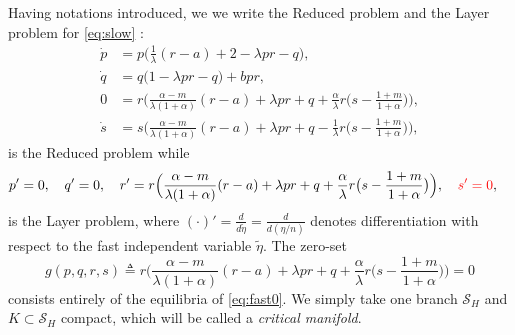 \documentclass[a4paper,11pt]{article}
\def\red{\color{red}}
\theoremstyle{remark}
\begin{document}
Having notations introduced, we we write the Reduced problem and the Layer problem for \eqref{eq:slow} :
\begin{equation}\label{eq:slow0} \tag{R}
 \begin{aligned}
 \dot{p} &=p\Big(\frac{1}{\lambda}({r}-a) + 2- \lambda p {r} -q\Big),\\%
 \dot{q} &=q\Big(1 -\lambda p {r} -q\Big) + b p {r},\\%
 0&=r\Big(\frac{\alpha-m}{\lambda(1+\alpha)}(r-a) + \lambda pr + q +\frac{\alpha}{\lambda}r\big(s- \frac{1+m}{1+\alpha}\big)\Big),\\
 \dot{s} &=s\Big(\frac{\alpha-m}{\lambda(1+\alpha)}({r}-a) + \lambda p{r} + q - \frac{1}{\lambda}{r}\big(s- \frac{1+m}{1+\alpha}\big)\Big),%
 \end{aligned}
\end{equation}
is the Reduced problem while
\begin{equation} \label{eq:fast0} 
 \begin{aligned}
 {p}' &=0, \quad {q}' =0, \quad {r}' =r\Big(\frac{\alpha-m}{\lambda(1+\alpha)}(r-a) + \lambda pr + q +\frac{\alpha}{\lambda}r\big(s- \frac{1+m}{1+\alpha}\big)\Big), {\red  \quad{s}' =0 },
 \end{aligned}
\end{equation}
is the Layer problem, where $(\cdot)'= \frac{d}{d\tilde{\eta}} = \frac{d}{d(\eta/n)}$ denotes differentiation with respect to the fast independent variable $\tilde{\eta}$. The zero-set
\begin{equation}
g(p,q,r,s)\triangleq r\Big(\frac{\alpha-m}{\lambda(1+\alpha)}(r-a) + \lambda pr + q +\frac{\alpha}{\lambda}r\big(s- \frac{1+m}{1+\alpha}\big)\Big)=0 \label{eq:zeroset} 
\end{equation}
consists entirely of the equilibria of \eqref{eq:fast0}. We simply take one branch $\mathcal{S}_H$ and $K\subset\mathcal{S}_H$ compact, which will be called a {\it critical manifold}. 
\end{document}

